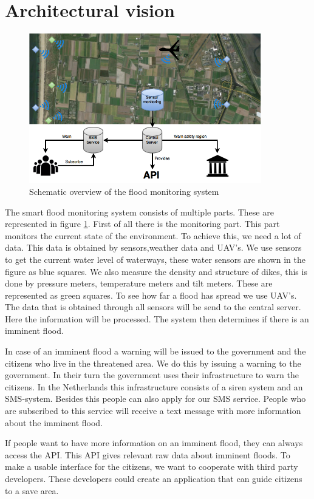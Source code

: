 \section{Architectural vision}
\begin{figure}[hb!]
\includegraphics[keepaspectratio=true,width=0.9\textwidth]{images/archVision.png}
\caption{Schematic overview of the flood monitoring system}
\label{fig:architectural-vision}
\end{figure}

The smart flood monitoring system consists of multiple parts. These are represented in figure \ref{fig:architectural-vision}. First of all there is the monitoring part. This part monitors the current state of the environment. To achieve this, we need a lot of data. This data is obtained by sensors,weather data and UAV's. We use sensors to get the current water level of waterways, these water sensors are shown in the figure as blue squares. We also measure the density and structure of dikes, this is done by pressure meters, temperature meters and tilt meters. These are represented as green squares. To see how far a flood has spread we use UAV's. The data that is obtained through all sensors will be send to the central server. Here the information will be processed. The system then determines if there is an imminent flood.

In case of an imminent flood a warning will be issued to the government and the citizens who live in the threatened area. We do this by issuing a warning to the government. In their turn the government uses their infrastructure to warn the citizens. In the Netherlands this infrastructure consists of a siren system and an SMS-system. Besides this people can also apply for our SMS service. People who are subscribed to this service will receive a text message with more information about the imminent flood. 

If people want to have more information on an imminent flood, they can always access the API. This API gives relevant raw data about imminent floods. To make a usable interface for the citizens, we want to cooperate with third party developers. These developers could create an application that can guide citizens to a save area.
